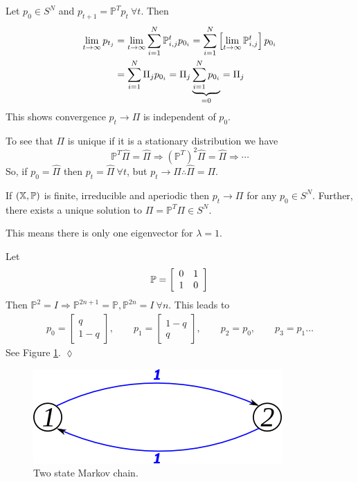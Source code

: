 Let $p_0\in S^N$ and $p_{t+1}=\mathbb{P}^Tp_t ~\forall t$. Then
\begin{align*}
\lim_{t\to\infty}p_{t_j} &= \lim_{t\to\infty}\sum_{i=1}^N\mathbb{P}_{i,j}^tp_{0_i} = \sum_{i=1}^N\left[\lim_{t\to\infty}\mathbb{P}_{i,j}^t\right]p_{0_i} \\
&= \sum_{i=1}^N\Pi_jp_{0_i} = \Pi_j\underbrace{\sum_{i=1}^Np_{0_i}}_{=0} = \Pi_j
\end{align*}
This shows convergence $p_t\rightarrow\Pi$ is independent of $p_0$.

To see that $\Pi$ is unique if it is a stationary distribution we have
$$\mathbb{P}^T\hat{\Pi} = \hat{\Pi} \Rightarrow (\mathbb{P}^T)^2\hat{\Pi} = \hat{\Pi} \Rightarrow \cdots$$
So, if $p_0=\hat{\Pi}$ then $p_t=\hat{\Pi} ~\forall t$, but $p_t\rightarrow\Pi \therefore \hat{\Pi}=\Pi$.

\begin{corollary}
If $(\mathbb{X},\mathbb{P})$ is finite, irreducible and aperiodic then $p_t\rightarrow\Pi$ for any $p_0\in S^N$. Further, there exists a unique solution to $\Pi=\mathbb{P}^T\Pi \in S^N$.
\end{corollary}
This means there is only one eigenvector for $\lambda=1$.

\begin{example}
Let
$$\mathbb{P} = \left[\begin{array}{c c} 0 & 1 \\ 1 & 0 \end{array}\right]$$
Then $\mathbb{P}^2=I \Rightarrow \mathbb{P}^{2n+1}=\mathbb{P}, \mathbb{P}^{2n}=I ~\forall n$. This leads to
\begin{align*}
p_0 = \left[\begin{array}{c} q \\ 1-q \end{array}\right],
\qquad p_1 = \left[\begin{array}{c} 1-q \\ q \end{array}\right],
\qquad p_2 = p_0,
\qquad p_3=p_1\ldots
\end{align*}
See Figure \ref{fig:10mc2}.
$\lozenge$
\end{example}

\begin{figure}[ht!]
	\centering
	\includegraphics[width=.4\textwidth]{images/10mc2}
	\caption{Two state Markov chain.}
	\label{fig:10mc2}
\end{figure}

